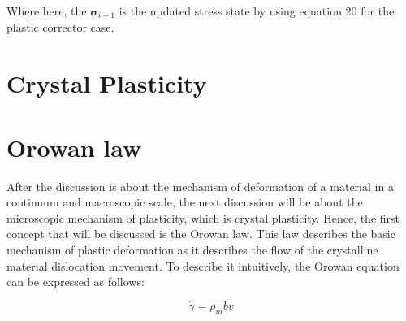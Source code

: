\documentclass[12pt]{article}
\begin{document}
Where here, the $\boldsymbol{\sigma}_{i+1}$ is the updated stress state by using equation 20 for the plastic 
corrector case.

\section*{Crystal Plasticity}
\section{Orowan law}
\hspace{2em}After the discussion is about the mechanism of deformation of a material in a continuum and macroscopic scale,
the next discussion will be about the microscopic mechanism of plasticity, which is crystal plasticity. Hence, the first 
concept that will be discussed is the Orowan law. This law describes the basic mechanism of plastic deformation
as it describes the flow of the crystalline material dislocation movement. To describe it intuitively, 
the Orowan equation can be expressed as follows:

\begin{equation}
    \dot{\gamma} = \rho_m b v
\end{equation}
\end{document}

